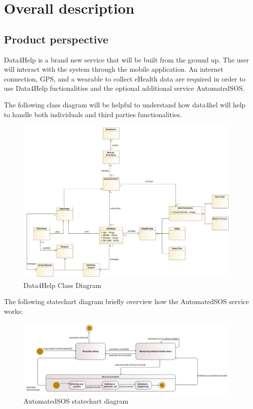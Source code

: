 \chapter{Overall description}
\section{Product perspective}
Data4Help is a brand new service that will be built from the ground up. The user will interact with the system through the mobile application. An internet connection, GPS, and a wearable to collect eHealth data are required in order to use Data4Help fuctionalities and the optional additional service AutomatedSOS.

The following class diagram will be helpful to understand how data4hel will help to handle both individuals and third parties functionalities.

\begin{figure}[H]
  \includegraphics[width=0.79\linewidth]{resources/UML/Data4HelpClassDiagram.png}
  \caption{Data4Help Class Diagram}
  \label{fig: Data4Help Class diagram}
\end{figure}

The following statechart diagram briefly overview how the AutomatedSOS service works:

\begin{figure}[H]
  \includegraphics[width=0.79\linewidth]{resources/UML/AutomatedSOSstatechart.png}
  \caption{AutomatedSOS statechart diagram}
  \label{fig: AutoamtedSOS statechart diagram}
\end{figure}


